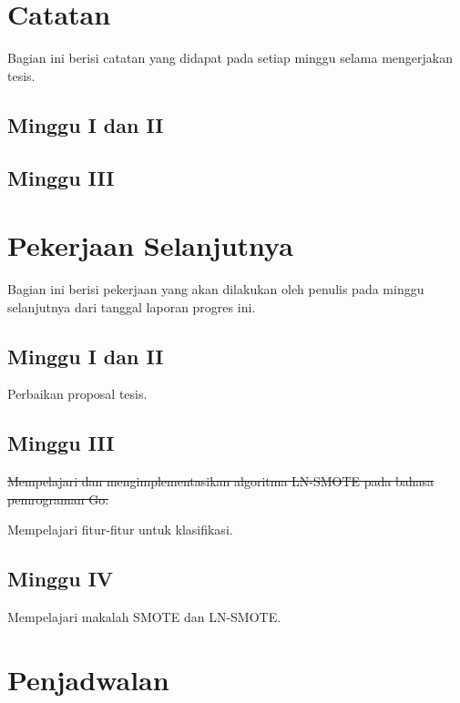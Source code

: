 \newpage
\section{Catatan} \label{sec:catatan}

Bagian ini berisi catatan yang didapat pada setiap minggu selama mengerjakan tesis.

\subsection{Minggu I dan II}


\subsection{Minggu III}


\section{Pekerjaan Selanjutnya}

Bagian ini berisi pekerjaan yang akan dilakukan oleh penulis pada minggu selanjutnya dari tanggal laporan progres ini.

\subsection{Minggu I dan II}

Perbaikan proposal tesis.

\subsection{Minggu III}

\sout{
Mempelajari dan mengimplementasikan algoritma LN-SMOTE pada bahasa pemrograman Go.
}

Mempelajari fitur-fitur untuk klasifikasi.

\subsection{Minggu IV}

Mempelajari makalah SMOTE dan LN-SMOTE.


\newpage
\section{Penjadwalan}\label{sec:penjadwalan}

